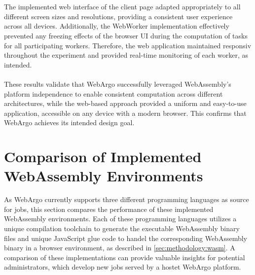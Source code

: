 \\~\\
The implemented web interface of the client page adapted appropriately to all different screen sizes and resolutions, providing a consistent user experience across all devices. Additionally, the WebWorker implementation effectively prevented any freezing effects of the browser \ac{UI} during the computation of tasks for all participating workers. Therefore, the web application maintained responsiv throughout the experiment and provided real-time monitoring of each worker, as intended.
\\~\\
These results validate that WebArgo successfully leveraged WebAssembly's platform independence to enable consistent computation across different architectures, while the web-based approach provided a uniform and easy-to-use application, accessible on any device with a modern browser. This confirms that WebArgo achieves its intended design goal.

\section{Comparison of Implemented WebAssembly Environments}
\label{sec:evaluation:languages}
As WebArgo currently supports three different programming languages as source for jobs, this section compares the performance of these implemented WebAssembly environments. Each of these programming languages utilizes a unique compilation toolchain to generate the executable WebAssembly binary files and unique JavaScript glue code to handel the corresponding WebAssembly binary in a browser environment, as described in \autoref{sec:methodology:wasm}. A comparison of these implementations can provide valuable insights for potential administrators, which develop new jobs served by a hostet WebArgo platform.

